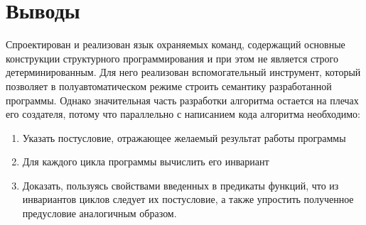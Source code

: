 \section{Выводы} \label{ch3:conclusion}
Спроектирован и реализован язык охраняемых команд, содержащий основные конструкции структурного программирования
и при этом не является строго детерминированным. Для него реализован вспомогательный инструмент,
который позволяет в полуавтоматическом режиме строить семантику разработанной программы. Однако значительная часть
разработки алгоритма остается на плечах его создателя, потому что параллельно с написанием кода алгоритма необходимо:
\begin{enumerate}
    \item Указать постусловие, отражающее желаемый результат работы программы
    \item Для каждого цикла программы вычислить его инвариант
    \item Доказать, пользуясь свойствами введенных в предикаты функций, что из инвариантов циклов 
    следует их постусловие, а также упростить полученное предусловие аналогичным образом.
\end{enumerate}